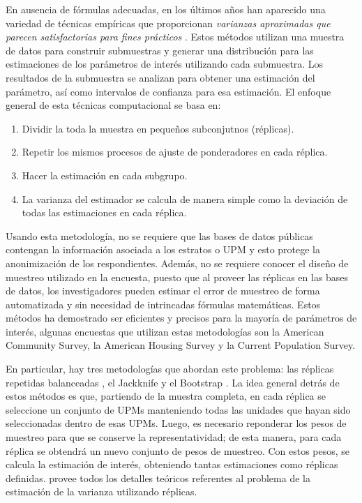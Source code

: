 \documentclass[
  10pt,
  spanish,
]{book}
\providecommand{\tightlist}{%
  \setlength{\itemsep}{0pt}\setlength{\parskip}{0pt}}
\begin{document}
En ausencia de fórmulas adecuadas, en los últimos años han aparecido una variedad de técnicas empíricas que proporcionan \emph{varianzas aproximadas que parecen satisfactorias para fines prácticos} \citep{Kish_1965}. Estos métodos utilizan una muestra de datos para construir submuestras y generar una distribución para las estimaciones de los parámetros de interés utilizando cada submuestra. Los resultados de la submuestra se analizan para obtener una estimación del parámetro, así como intervalos de confianza para esa estimación. El enfoque general de esta técnicas computacional se basa en:

\begin{enumerate}
\def\labelenumi{\arabic{enumi}.}
\tightlist
\item
  Dividir la toda la muestra en pequeños subconjutnos (réplicas).
\item
  Repetir los mismos procesos de ajuste de ponderadores en cada réplica.
\item
  Hacer la estimación en cada subgrupo.
\item
  La varianza del estimador se calcula de manera simple como la deviación de todas las estimaciones en cada réplica.
\end{enumerate}

Usando esta metodología, no se requiere que las bases de datos públicas contengan la información asociada a los estratos o UPM y esto protege la anonimización de los respondientes. Además, no se requiere conocer el diseño de muestreo utilizado en la encuesta, puesto que al proveer las réplicas en las bases de datos, los investigadores pueden estimar el error de muestreo de forma automatizada y sin necesidad de intrincadas fórmulas matemáticas. Estos métodos ha demostrado ser eficientes y precisos para la mayoría de parámetros de interés, algunas encuestas que utilizan estas metodologías son la American Community Survey, la American Housing Survey y la Current Population Survey.

En particular, hay tres metodologías que abordan este problema: las réplicas repetidas balanceadas \citep{McCarthy_1969, Judkins_1990}, el Jackknife \citep{Krewski_Rao_1981} y el Bootstrap \citep{Rao_Wu_1988}. La idea general detrás de estos métodos es que, partiendo de la muestra completa, en cada réplica se seleccione un conjunto de UPMs manteniendo todas las unidades que hayan sido seleccionadas dentro de esas UPMs. Luego, es necesario reponderar los pesos de muestreo para que se conserve la representatividad; de esta manera, para cada réplica se obtendrá un nuevo conjunto de pesos de muestreo. Con estos pesos, se calcula la estimación de interés, obteniendo tantas estimaciones como réplicas definidas. \citet{Wolter_2007} provee todos los detalles teóricos referentes al problema de la estimación de la varianza utilizando réplicas.
\end{document}

